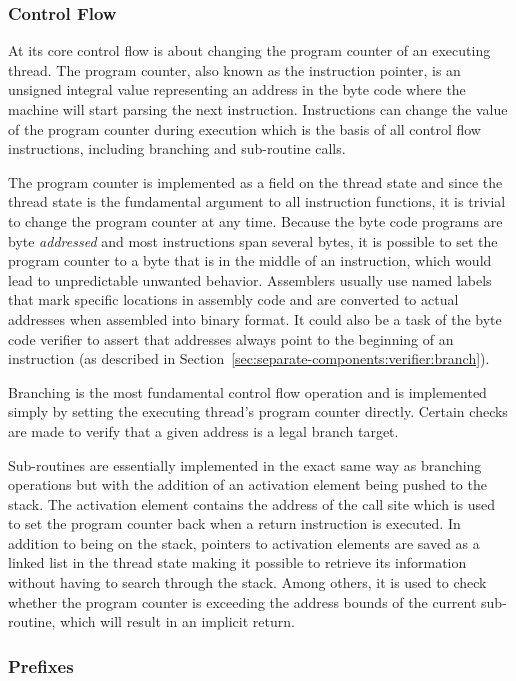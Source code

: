 \subsubsection{Control Flow}
\label{sec:implementation:instr:control-flow}

At its core control flow is about changing the program counter of an executing
thread. The program counter, also known as the instruction pointer, is an
unsigned integral value representing an address in the byte code where the
machine will start parsing the next instruction. Instructions can change the
value of the program counter during execution which is the basis of all control
flow instructions, including branching and sub-routine calls.

The program counter is implemented as a field on the thread state and since the
thread state is the fundamental argument to all instruction functions, it is
trivial to change the program counter at any time. Because the byte code
programs are byte \textit{addressed} and most instructions span several bytes,
it is possible to set the program counter to a byte that is in the middle of an
instruction, which would lead to unpredictable unwanted behavior. Assemblers
usually use named labels that mark specific locations in assembly code and are
converted to actual addresses when assembled into binary format. It could also
be a task of the byte code verifier to assert that addresses always point to the
beginning of an instruction (as described in
Section~\ref{sec:separate-components:verifier:branch}).

Branching is the most fundamental control flow operation and is implemented
simply by setting the executing thread's program counter directly. Certain
checks are made to verify that a given address is a legal branch target.

Sub-routines are essentially implemented in the exact same way as branching
operations but with the addition of an activation element being pushed to the
stack. The activation element contains the address of the call site which is
used to set the program counter back when a return instruction is executed. In
addition to being on the stack, pointers to activation elements are saved as a
linked list in the thread state making it possible to retrieve its information
without having to search through the stack. Among others, it is used to check
whether the program counter is exceeding the address bounds of the current
sub-routine, which will result in an implicit return.

\subsubsection{Prefixes}

